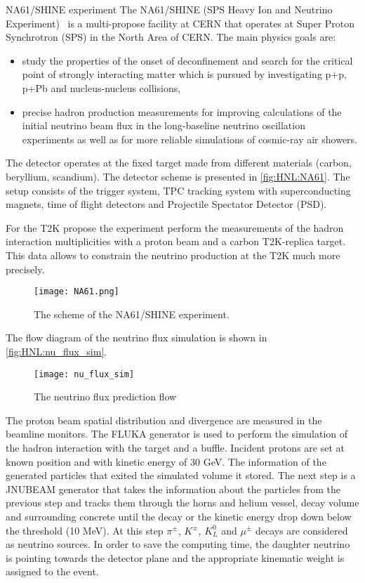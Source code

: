 \documentclass[../main.tex]{subfiles}
\begin{document}
\begin{bclogo}[couleur=blue!2, arrondi=0.1, logo=\bcinfo, nobreak=true]{NA61/SHINE experiment}
The NA61/SHINE (SPS Heavy Ion and Neutrino Experiment)~\cite{Abgrall2014} is a multi-propose facility at CERN that operates at Super Proton Synchrotron (SPS) in the North Area of CERN. The main physics goals are:
\begin{itemize}
    \item study the properties of the onset of deconfinement and search for the critical point of strongly interacting matter which is pursued by investigating p+p, p+Pb and nucleus-nucleus collisions,
    \item precise hadron production measurements for improving calculations of the initial neutrino beam flux in the long-baseline neutrino oscillation experiments as well as for more reliable simulations of cosmic-ray air showers.
\end{itemize}
The detector operates at the fixed target made from different materials (carbon, beryllium, scandium). The detector scheme is presented in \autoref{fig:HNL:NA61}. The setup consists of the trigger system, TPC tracking system with superconducting magnets, time of flight detectors and Projectile Spectator Detector (PSD).

For the T2K propose the experiment perform the measurements of the hadron interaction multiplicities with a proton beam and a carbon T2K-replica target. This data allows to constrain the neutrino production at the T2K much more precisely.
\end{bclogo}

\begin{figure}[!ht]
    \centering
    \texttt{[image: NA61.png]}
    \caption{The scheme of the NA61/SHINE experiment.}
    \label{fig:HNL:NA61}
\end{figure}

The flow diagram of the neutrino flux simulation is shown in \autoref{fig:HNL:nu_flux_sim}.

\begin{figure}[!ht]
    \centering
    \texttt{[image: nu\_flux\_sim]}
    \caption{The neutrino flux prediction flow}
    \label{fig:HNL:nu_flux_sim}
\end{figure}

The proton beam spatial distribution and divergence are measured in the beamline monitors. The FLUKA generator is used to perform the simulation of the hadron interaction with the target and a buffle. Incident protons are set at known position and with kinetic energy of 30 GeV. The information of the generated particles that exited the simulated volume it stored. The next step is a JNUBEAM generator that takes the information about the particles from the previous step and tracks them through the horns and helium vessel, decay volume and surrounding concrete until the decay or the kinetic energy drop down below the threshold (10 MeV). At this step $\pi^\pm$, $K^\pm$, $K_L^0$ and $\mu^\pm$ decays are considered as neutrino sources. In order to save the computing time, the daughter neutrino is pointing towards the detector plane and the appropriate kinematic weight is assigned to the event.
\end{document}
